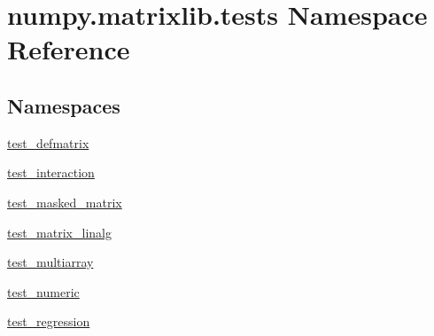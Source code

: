 \hypertarget{namespacenumpy_1_1matrixlib_1_1tests}{}\section{numpy.\+matrixlib.\+tests Namespace Reference}
\label{namespacenumpy_1_1matrixlib_1_1tests}
\subsection*{Namespaces}
\begin{DoxyCompactItemize}
\item 
 \hyperlink{namespacenumpy_1_1matrixlib_1_1tests_1_1test__defmatrix}{test\+\_\+defmatrix}
\item 
 \hyperlink{namespacenumpy_1_1matrixlib_1_1tests_1_1test__interaction}{test\+\_\+interaction}
\item 
 \hyperlink{namespacenumpy_1_1matrixlib_1_1tests_1_1test__masked__matrix}{test\+\_\+masked\+\_\+matrix}
\item 
 \hyperlink{namespacenumpy_1_1matrixlib_1_1tests_1_1test__matrix__linalg}{test\+\_\+matrix\+\_\+linalg}
\item 
 \hyperlink{namespacenumpy_1_1matrixlib_1_1tests_1_1test__multiarray}{test\+\_\+multiarray}
\item 
 \hyperlink{namespacenumpy_1_1matrixlib_1_1tests_1_1test__numeric}{test\+\_\+numeric}
\item 
 \hyperlink{namespacenumpy_1_1matrixlib_1_1tests_1_1test__regression}{test\+\_\+regression}
\end{DoxyCompactItemize}
